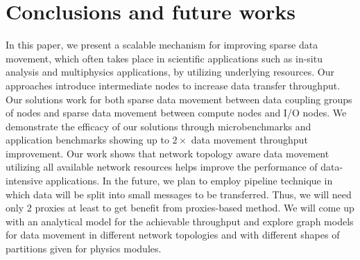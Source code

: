 \section{Conclusions and future works}
\label{sec:conclusions}

In this paper, we present a scalable mechanism for improving sparse data movement, which often takes place in scientific applications such as  in-situ analysis and multiphysics applications, by utilizing underlying resources. Our approaches introduce intermediate nodes to increase data transfer throughput. Our solutions work for both sparse data movement between data coupling groups of nodes and sparse data movement between compute nodes and I/O nodes. We demonstrate the efficacy of our solutions through microbenchmarks and application benchmarks showing up to $2\times$ data movement throughput improvement. Our work shows that network topology aware data movement utilizing all available network resources helps improve the performance of data-intensive applications.
In the future, we plan to employ pipeline technique in which data will be split into small messages to be transferred. Thus, we will need only 2 proxies at least to get benefit from proxies-based method. We will come up with an analytical model for the achievable throughput and explore graph models for data movement in different network topologies and with different shapes of partitions given for physics modules.


